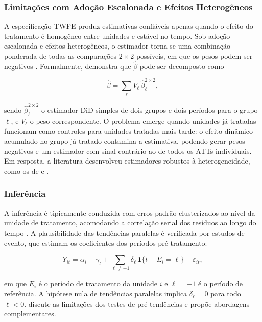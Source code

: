 \documentclass[a4paper,12pt]{article}
\begin{document}
\subsubsection{Limitações com Adoção Escalonada e Efeitos Heterogêneos}

A especificação TWFE produz estimativas confiáveis apenas quando o efeito do tratamento
é homogêneo entre unidades e estável no tempo. Sob adoção escalonada e efeitos
heterogêneos, o estimador torna-se uma combinação ponderada de todas as comparações
$2\times2$ possíveis, em que os pesos podem ser negativos
\cite{chaisemartin2020, goodmanbacon2021}. Formalmente, 
demonstra que $\hat{\beta}$ pode ser decomposto como

\begin{equation}
\hat{\beta} = \sum_{\ell} V_{\ell}\, \hat{\beta}_{\ell}^{2\times2},
\end{equation}

sendo $\hat{\beta}_{\ell}^{2\times2}$ o estimador DiD simples de dois grupos e dois
períodos para o grupo $\ell$, e $V_{\ell}$ o peso correspondente. O problema emerge
quando unidades já tratadas funcionam como controles para unidades tratadas mais tarde: o
efeito dinâmico acumulado no grupo já tratado contamina a estimativa, podendo gerar
pesos negativos e um estimador com sinal contrário ao de todos os ATTs individuais. Em
resposta, a literatura desenvolveu estimadores robustos à heterogeneidade, como os de
 e .

\subsubsection{Inferência}

A inferência é tipicamente conduzida com erros-padrão clusterizados ao nível da unidade
de tratamento, acomodando a correlação serial dos resíduos ao longo do tempo
\cite{bertrand2004}. A plausibilidade das tendências paralelas é verificada por estudos de
evento, que estimam os coeficientes dos períodos pré-tratamento:

\begin{equation}
Y_{it} = \alpha_i + \gamma_t + \sum_{\ell \neq -1} \delta_\ell\,
\mathbf{1}\{t - E_i = \ell\} + \varepsilon_{it},
\end{equation}

em que $E_i$ é o período de tratamento da unidade $i$ e $\ell = -1$ é o período de
referência. A hipótese nula de tendências paralelas implica $\delta_\ell = 0$ para todo
$\ell < 0$.  discute as limitações dos testes de pré-tendências e
propõe abordagens complementares.
\end{document}
